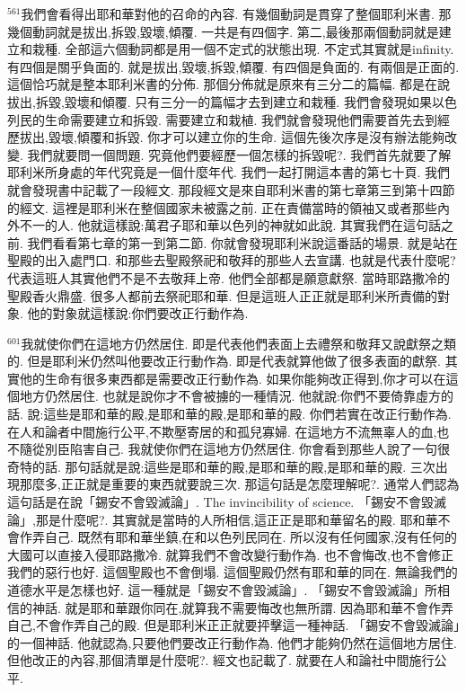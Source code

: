 \documentclass{book}
\begin{document}
$^{561}$我們會看得出耶和華對他的召命的內容.
有幾個動詞是貫穿了整個耶利米書.
那幾個動詞就是拔出,拆毀,毀壞,傾覆.
一共是有四個字.
第二,最後那兩個動詞就是建立和栽種.
全部這六個動詞都是用一個不定式的狀態出現.
不定式其實就是infinity.
有四個是關乎負面的.
就是拔出,毀壞,拆毀,傾覆.
有四個是負面的.
有兩個是正面的.
這個恰巧就是整本耶利米書的分佈.
那個分佈就是原來有三分二的篇幅.
都是在說拔出,拆毀,毀壞和傾覆.
只有三分一的篇幅才去到建立和栽種.
我們會發現如果以色列民的生命需要建立和拆毀.
需要建立和栽植.
我們就會發現他們需要首先去到經歷拔出,毀壞,傾覆和拆毀.
你才可以建立你的生命.
這個先後次序是沒有辦法能夠改變.
我們就要問一個問題.
究竟他們要經歷一個怎樣的拆毀呢?.
我們首先就要了解耶利米所身處的年代究竟是一個什麼年代.
我們一起打開這本書的第七十頁.
我們就會發現書中記載了一段經文.
那段經文是來自耶利米書的第七章第三到第十四節的經文.
這裡是耶利米在整個國家未被露之前.
正在責備當時的領袖又或者那些內外不一的人.
他就這樣說:萬君子耶和華以色列的神就如此說.
其實我們在這句話之前.
我們看看第七章的第一到第二節.
你就會發現耶利米說這番話的場景.
就是站在聖殿的出入處門口.
和那些去聖殿祭祀和敬拜的那些人去宣講.
也就是代表什麼呢?代表這班人其實他們不是不去敬拜上帝.
他們全部都是願意獻祭.
當時耶路撒冷的聖殿香火鼎盛.
很多人都前去祭祀耶和華.
但是這班人正正就是耶利米所責備的對象.
他的對象就這樣說:你們要改正行動作為.

$^{601}$我就使你們在這地方仍然居住.
即是代表他們表面上去禮祭和敬拜又說獻祭之類的.
但是耶利米仍然叫他要改正行動作為.
即是代表就算他做了很多表面的獻祭.
其實他的生命有很多東西都是需要改正行動作為.
如果你能夠改正得到,你才可以在這個地方仍然居住.
也就是說你才不會被擄的一種情況.
他就說:你們不要倚靠虛方的話.
說:這些是耶和華的殿,是耶和華的殿,是耶和華的殿.
你們若實在改正行動作為.
在人和論者中間施行公平,不欺壓寄居的和孤兒寡婦.
在這地方不流無辜人的血,也不隨從別臣陷害自己.
我就使你們在這地方仍然居住.
你會看到那些人說了一句很奇特的話.
那句話就是說:這些是耶和華的殿,是耶和華的殿,是耶和華的殿.
三次出現那麼多,正正就是重要的東西就要說三次.
那這句話是怎麼理解呢?.
通常人們認為這句話是在說「錫安不會毀滅論」.
The invincibility of science.
「錫安不會毀滅論」,那是什麼呢?.
其實就是當時的人所相信,這正正是耶和華留名的殿.
耶和華不會作弄自己.
既然有耶和華坐鎮,在和以色列民同在.
所以沒有任何國家,沒有任何的大國可以直接入侵耶路撒冷.
就算我們不會改變行動作為.
也不會悔改,也不會修正我們的惡行也好.
這個聖殿也不會倒塌.
這個聖殿仍然有耶和華的同在.
無論我們的道德水平是怎樣也好.
這一種就是「錫安不會毀滅論」.
「錫安不會毀滅論」所相信的神話.
就是耶和華跟你同在,就算我不需要悔改也無所謂.
因為耶和華不會作弄自己,不會作弄自己的殿.
但是耶利米正正就要抨擊這一種神話.
「錫安不會毀滅論」的一個神話.
他就認為,只要他們要改正行動作為.
他們才能夠仍然在這個地方居住.
但他改正的內容,那個清單是什麼呢?.
經文也記載了.
就要在人和論社中間施行公平.
\end{document}
